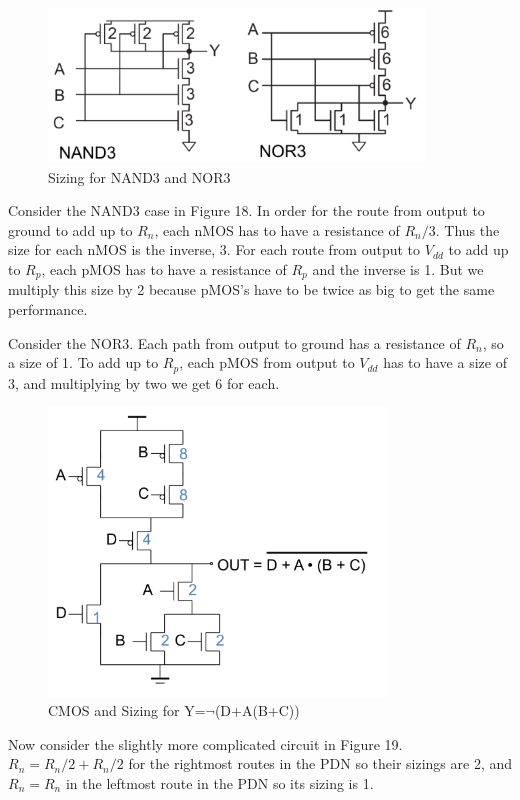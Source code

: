 \documentclass{article}
\begin{document}
\begin{figure}[ht!]
\centering
\includegraphics[width=100mm]{Sizing.png}
\caption{Sizing for NAND3 and NOR3}
\end{figure}

Consider the NAND3 case in Figure 18. In order for the route from output to ground to add up to $R_n$, each nMOS has to have a resistance of $R_n/3$. Thus the size for each nMOS is the inverse, 3. For each route from output to $V_{dd}$ to add up to $R_p$, each pMOS has to have a resistance of $R_p$ and the inverse is 1. But we multiply this size by 2 because pMOS's have to be twice as big to get the same performance.

Consider the NOR3. Each path from output to ground has a resistance of $R_n$, so a size of 1. To add up to $R_p$, each pMOS from output to $V_{dd}$ has to have a size of 3, and multiplying by two we get 6 for each. 

\begin{figure}[ht!]
\centering
\includegraphics[width=90mm]{Sizing2.png}
\caption{CMOS and Sizing for Y=$\neg$(D+A(B+C))}
\end{figure}

Now consider the slightly more complicated circuit in Figure 19. $R_n = R_n/2 + R_n/2$ for the rightmost routes in the PDN so their sizings are 2, and $R_n = R_n$ in the leftmost route in the PDN so its sizing is 1.
\end{document}
